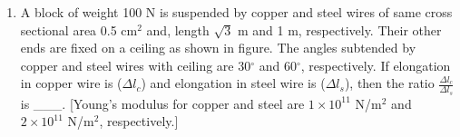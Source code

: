 
\begin{enumerate}
    \item A block of weight 100 N is suspended by copper and steel wires of same cross sectional area 0.5 cm\(^2\) and, length \(\sqrt{3}\) m and 1 m, respectively. Their other ends are fixed on a ceiling as shown in figure. The angles subtended by copper and steel wires with ceiling are 30\(^{\circ}\) and 60\(^{\circ}\), respectively. If elongation in copper wire is (\(\Delta l_c\)) and elongation in steel wire is (\(\Delta l_s\)), then the ratio \(\frac{\Delta l_c}{\Delta l_s}\) is \_\_\_. 
    [Young’s modulus for copper and steel are \(1\times10^{11}\) N/m\(^2\) and \(2\times10^{11}\) N/m\(^2\), respectively.]

    \centering
\end{enumerate}
